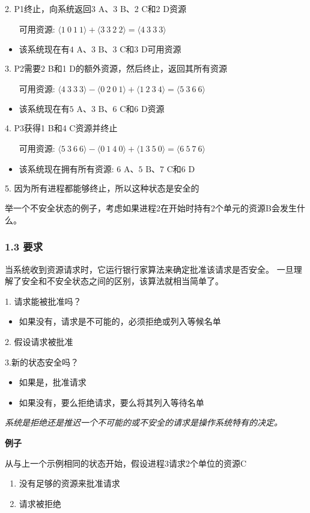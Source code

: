 2. P1终止，向系统返回3 A、3 B、2 C和2 D资源
    \begin{itemize}
        \item [可用资源: $\langle 1\ 0\ 1\ 1\rangle + \langle 3\ 3\ 2\ 2\rangle = \langle 4\ 3\ 3\ 3\rangle$]
        \item $\text{该系统现在有4 A、3 B、3 C和3 D可用资源}$
    \end{itemize}

3. P2需要2 B和1 D的额外资源，然后终止，返回其所有资源
    \begin{itemize}
        \item [可用资源: $\langle 4\ 3\ 3\ 3\rangle - \langle 0\ 2\ 0\ 1\rangle + \langle 1\ 2\ 3\ 4\rangle = \langle 5\ 3\ 6\ 6\rangle$]
        \item $\text{该系统现在有5 A、3 B、6 C和6 D资源}$
    \end{itemize}

4. P3获得1 B和4 C资源并终止
    \begin{itemize}
        \item [可用资源: $\langle 5\ 3\ 6\ 6\rangle - \langle 0\ 1\ 4\ 0\rangle + \langle 1\ 3\ 5\ 0\rangle = \langle 6\ 5\ 7\ 6\rangle$]
        \item $\text{该系统现在拥有所有资源: 6 A、5 B、7 C和6 D}$
    \end{itemize}

5. 因为所有进程都能够终止，所以这种状态是安全的

举一个不安全状态的例子，考虑如果进程2在开始时持有2个单元的资源B会发生什么。
\subsubsection{1.3 要求}
当系统收到资源请求时，它运行银行家算法来确定批准该请求是否安全。 一旦理解了安全和不安全状态之间的区别，该算法就相当简单了。

1. 请求能被批准吗？
\begin{itemize}
\item 如果没有，请求是不可能的，必须拒绝或列入等候名单
\end{itemize}

2. 假设请求被批准

3.新的状态安全吗？
\begin{itemize}
\item 如果是，批准请求
\item 如果没有，要么拒绝请求，要么将其列入等待名单
\end{itemize}

\textsl{系统是拒绝还是推迟一个不可能的或不安全的请求是操作系统特有的决定。}

\textbf{例子}

从与上一个示例相同的状态开始，假设进程3请求2个单位的资源C
\begin{enumerate}
\item 没有足够的资源来批准请求
\item 请求被拒绝
\end{enumerate}
